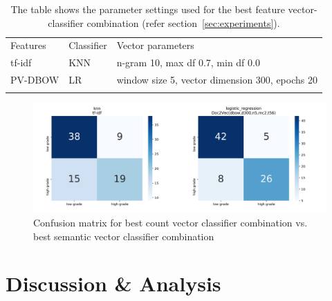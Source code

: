 \documentclass[runningheads]{llncs}
\begin{document}
%
%
%
\begin{table}[]
    \centering
    \caption{The table shows the parameter settings used for the best feature vector-classifier combination (refer section~\ref{sec:experiments}).}
    \begin{tabular}{ p{2cm}p{1.5cm}p{7cm} }
    \Xhline{1pt}
     Features & Classifier & Vector parameters \\
    \Xhline{1pt}
     tf-idf & KNN & n-gram 10, max df 0.7, min df 0.0 \\
     PV-DBOW & LR &
         window size 5,
         vector dimension 300,
         epochs 20 \\
    \Xhline{1pt}
    \end{tabular}
    \label{tab:hp}
\end{table}
%
%
%
\begin{figure}
    \centering
    \includegraphics[scale=0.35]{figures/merge_confusionMatrix.jpg}
    \caption{Confusion matrix for best count vector classifier combination vs. best semantic vector classifier combination}
    \label{fig:cm}
\end{figure}
%
\section{Discussion \& Analysis}
\label{sec:disc}
%
\end{document}
